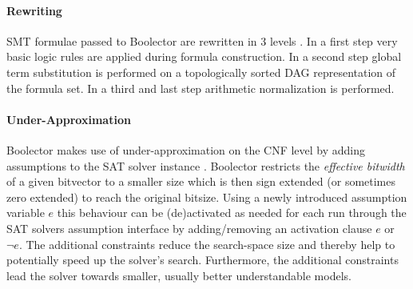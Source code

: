 \paragraph{Rewriting}
SMT formulae passed to Boolector are rewritten in 3 levels \cite{Brummayer-Biere2009_Chapter_BoolectorAnEfficientSMTSolverF}. In a first step very basic logic rules are applied during formula construction. In a second step global term substitution is performed on a topologically sorted DAG representation of the formula set. In a third and last step arithmetic normalization is performed.

\paragraph{Under-Approximation}
Boolector makes use of under-approximation on the CNF level by adding assumptions to the SAT solver instance \cite{Brummayer-PhD}. Boolector restricts the \textit{effective bitwidth} of a given bitvector to a smaller size which is then sign extended (or sometimes zero extended) to reach the original bitsize. Using a newly introduced assumption variable $e$ this behaviour can be (de)activated as needed for each run through the SAT solvers assumption interface by adding/removing an activation clause $e$ or $\neg e$. The additional constraints reduce the search-space size and thereby help to potentially speed up the solver's search. Furthermore, the additional constraints lead the solver towards smaller, usually better understandable models.

